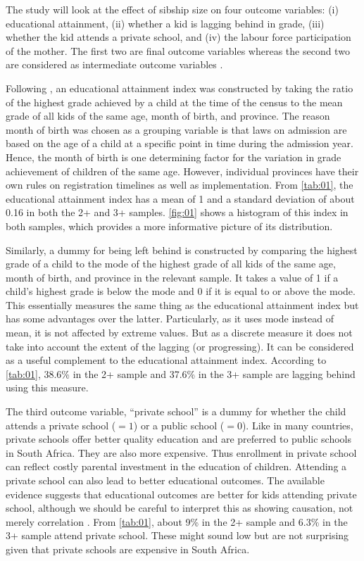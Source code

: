 The study will look at the effect of sibship size on four outcome variables: (i) educational attainment, (ii) whether a kid is lagging behind in grade, (iii) whether the kid attends a private school, and (iv) the labour force participation of the mother. The first two are final outcome variables whereas the second two are considered as intermediate outcome variables \parencite{caceres-delpiano_impacts_2006}. 

Following \textcite{rosenzweig_testing_1980}, an educational attainment index was constructed by taking the ratio of the highest grade achieved by a child at the time of the census to the mean grade of all kids of the same age, month of birth, and province. The reason month of birth was chosen as a grouping variable is that laws on admission are based on the age of a child at a specific point in time during the admission year.  Hence, the month of birth is one determining factor for the variation in grade achievement of children of the same age. However, individual provinces have their own rules on registration timelines as well as implementation. From \autoref{tab:01}, the educational attainment index has a mean of 1 and a standard deviation of about 0.16 in both the 2+ and 3+ samples. \autoref{fig:01} shows a histogram of this index in both samples, which provides a more informative picture of its distribution. 

Similarly, a dummy for being left behind is constructed by comparing the highest grade of a child to the mode of the highest grade of all kids of the same age, month of birth, and province in the relevant sample. It takes a value of 1 if a child's highest grade is below the mode and 0 if it is equal to or above the mode. This essentially measures the same thing as the educational attainment index but has some advantages over the latter. Particularly, as it uses mode instead of mean, it is not affected by extreme values. But as a discrete measure it does not take into account the extent of the lagging (or progressing). It can be considered as a useful complement to the educational attainment index. According to \autoref{tab:01}, 38.6\% in the 2+ sample and 37.6\% in the 3+ sample are lagging behind using this measure. 

The third outcome variable, \enquote{private school} is a dummy for whether the child attends a private school ($ = 1 $) or a public school ($ = 0 $). Like in many countries, private schools offer better quality education and are preferred to public schools in South Africa. They are also more expensive. Thus enrollment in private school can reflect costly parental investment in the education of children. Attending a private school can also lead to better educational outcomes. The available evidence suggests that educational outcomes are better for kids attending private school, although we should be careful to interpret this as showing causation, not merely correlation \parencite{caceres-delpiano_impacts_2006}. From \autoref{tab:01}, about 9\% in the 2+ sample and 6.3\% in the 3+ sample attend private school. These might sound low but are not surprising given that private schools are expensive in South Africa.

